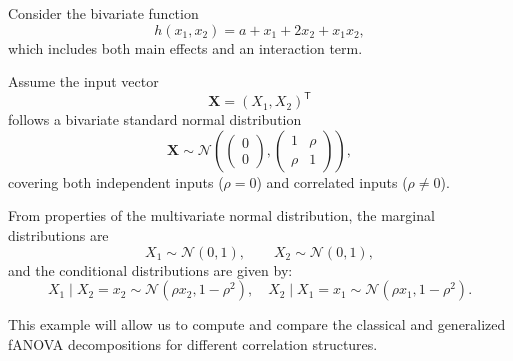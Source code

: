 \begin{example}\label{ex:running_example}
Consider the bivariate function
\begin{equation}\label{eq:running_example_function}
    h(x_1, x_2) = a + x_1 + 2x_2 + x_1 x_2,
\end{equation}
which includes both main effects and an interaction term.

Assume the input vector
\[
\boldsymbol{X} = (X_1, X_2)^\mathsf{T}
\]
follows a bivariate standard normal distribution
\[
\boldsymbol{X} \sim \mathcal{N}\!\left(
\begin{pmatrix}0 \\ 0\end{pmatrix},
\begin{pmatrix}
1 & \rho \\ 
\rho & 1
\end{pmatrix}
\right),
\]
covering both independent inputs ($\rho = 0$) and correlated inputs ($\rho \neq 0$).

From properties of the multivariate normal distribution, the marginal distributions are
\[
X_1 \sim \mathcal{N}(0,1), \qquad X_2 \sim \mathcal{N}(0,1),
\]
and the conditional distributions are given by:
\[
X_1 \mid X_2=x_2 \sim \mathcal{N}(\rho x_2, 1-\rho^2), \quad
X_2 \mid X_1=x_1 \sim \mathcal{N}(\rho x_1, 1-\rho^2).
\]
\end{example}



This example will allow us to compute and compare the classical and generalized fANOVA decompositions for different correlation structures.\par

